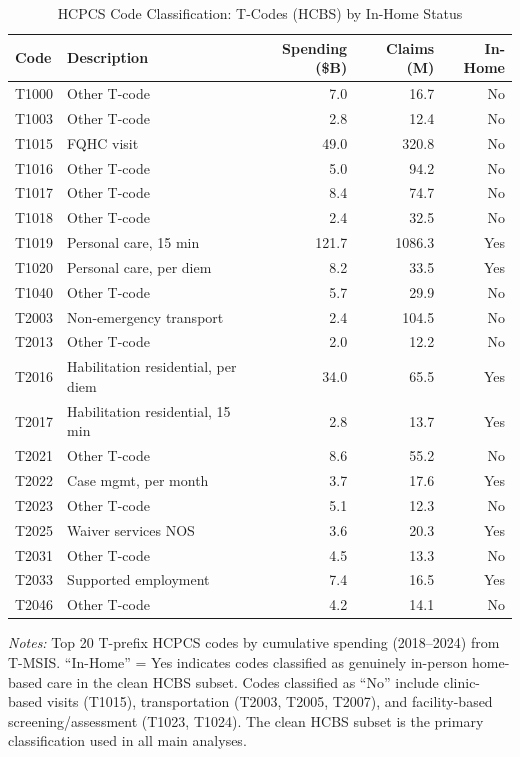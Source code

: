 \begin{table}[htbp]
\centering
\caption{HCPCS Code Classification: T-Codes (HCBS) by In-Home Status}
\label{tab:hcpcs}
\small
\begin{tabular}{llrrr}
\hline\hline
Code & Description & Spending (\$B) & Claims (M) & In-Home \\
\hline
T1000 & Other T-code & 7.0 & 16.7 & No \\
T1003 & Other T-code & 2.8 & 12.4 & No \\
T1015 & FQHC visit & 49.0 & 320.8 & No \\
T1016 & Other T-code & 5.0 & 94.2 & No \\
T1017 & Other T-code & 8.4 & 74.7 & No \\
T1018 & Other T-code & 2.4 & 32.5 & No \\
T1019 & Personal care, 15 min & 121.7 & 1086.3 & Yes \\
T1020 & Personal care, per diem & 8.2 & 33.5 & Yes \\
T1040 & Other T-code & 5.7 & 29.9 & No \\
T2003 & Non-emergency transport & 2.4 & 104.5 & No \\
T2013 & Other T-code & 2.0 & 12.2 & No \\
T2016 & Habilitation residential, per diem & 34.0 & 65.5 & Yes \\
T2017 & Habilitation residential, 15 min & 2.8 & 13.7 & Yes \\
T2021 & Other T-code & 8.6 & 55.2 & No \\
T2022 & Case mgmt, per month & 3.7 & 17.6 & Yes \\
T2023 & Other T-code & 5.1 & 12.3 & No \\
T2025 & Waiver services NOS & 3.6 & 20.3 & Yes \\
T2031 & Other T-code & 4.5 & 13.3 & No \\
T2033 & Supported employment & 7.4 & 16.5 & Yes \\
T2046 & Other T-code & 4.2 & 14.1 & No \\
\hline\hline
\end{tabular}
\begin{minipage}{0.85\textwidth}
\vspace{4pt}
\footnotesize
\textit{Notes:} Top 20 T-prefix HCPCS codes by cumulative spending (2018--2024) from T-MSIS. ``In-Home'' = Yes indicates codes classified as genuinely in-person home-based care in the clean HCBS subset. Codes classified as ``No'' include clinic-based visits (T1015), transportation (T2003, T2005, T2007), and facility-based screening/assessment (T1023, T1024). The clean HCBS subset is the primary classification used in all main analyses.
\end{minipage}
\end{table}
